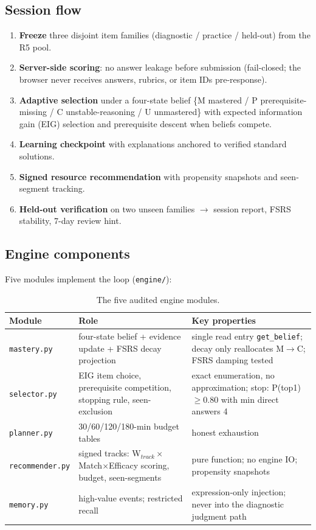\documentclass[11pt]{article}
\begin{document}
\subsection{Session flow}
\begin{enumerate}\setlength{\itemsep}{0pt}\setlength{\parskip}{0pt}\setlength{\parsep}{0pt}
\item \textbf{Freeze} three disjoint item families (diagnostic / practice / held-out) from the R5 pool.
\item \textbf{Server-side scoring}: no answer leakage before submission (fail-closed; the browser never receives answers, rubrics, or item IDs pre-response).
\item \textbf{Adaptive selection} under a four-state belief \{M mastered / P prerequisite-missing / C unstable-reasoning / U unmastered\} with expected information gain (EIG) selection and prerequisite descent when beliefs compete.
\item \textbf{Learning checkpoint} with explanations anchored to verified standard solutions.
\item \textbf{Signed resource recommendation} with propensity snapshots and seen-segment tracking.
\item \textbf{Held-out verification} on two unseen families $\rightarrow$ session report, FSRS stability, 7-day review hint.
\end{enumerate}

\subsection{Engine components}
Five modules implement the loop (\texttt{engine/}):
\begin{table}[h]
\centering
\small
\begin{tabular}{@{}p{2.6cm}p{4.4cm}p{6.2cm}@{}}
\toprule
\textbf{Module} & \textbf{Role} & \textbf{Key properties} \\
\midrule
\texttt{mastery.py} & four-state belief + evidence update + FSRS decay projection & single read entry \texttt{get\_belief}; decay only reallocates M$\rightarrow$C; FSRS damping tested \\
\texttt{selector.py} & EIG item choice, prerequisite competition, stopping rule, seen-exclusion & exact enumeration, no approximation; stop: P(top1)$\ge$0.80 with min direct answers 4 \\
\texttt{planner.py} & 30/60/120/180-min budget tables & honest exhaustion \\
\texttt{recommender.py} & signed tracks: W$_{track}\times$Match$\times$Efficacy scoring, budget, seen-segments & pure function; no engine IO; propensity snapshots \\
\texttt{memory.py} & high-value events; restricted recall & expression-only injection; never into the diagnostic judgment path \\
\bottomrule
\end{tabular}
\caption{The five audited engine modules.}
\label{tab:modules}
\end{table}
\end{document}
